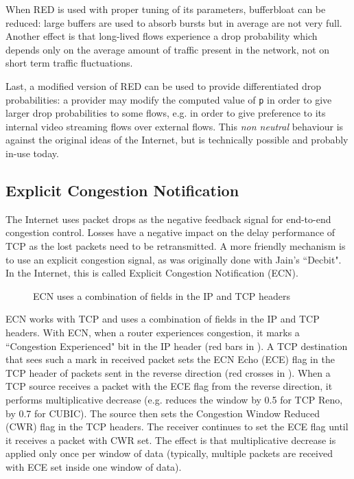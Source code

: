 
When RED is used with proper tuning of its parameters, bufferbloat can be reduced:  large buffers are used to absorb bursts but in average are not very full. Another effect is that long-lived flows experience a drop probability which depends only on the average amount of traffic present in the network, not on short term traffic fluctuations.

Last, a modified version of RED can be used to provide differentiated drop probabilities: a provider may modify the computed value of \texttt{p} in order to give larger drop probabilities to some flows, e.g. in order to give preference to its internal video streaming flows over external flows. This \emph{non neutral} behaviour is against the original ideas of the Internet, but is technically possible and probably in-use today.


\subsection{Explicit Congestion Notification}

The Internet uses packet drops as the negative feedback signal for
end-to-end congestion control. Losses have a negative impact on the delay performance of TCP as the lost packets need to be retransmitted. A more friendly mechanism is to use an explicit congestion signal, as was originally done with Jain's ``Decbit". In the Internet, this is called
Explicit Congestion Notification (ECN).

\begin{figure}[h]
  \caption{ECN uses a combination of fields in the IP and TCP headers}\label{fig-ecn}
\end{figure}


ECN works with TCP and uses a combination of fields in the IP and TCP headers. With ECN, when a router experiences congestion, it marks a ``Congestion Experienced" bit in the IP header (red bars in ). A TCP destination that sees such a mark in received packet sets the ECN Echo (ECE) flag in the TCP header of packets sent in the reverse direction (red crosses in ). When a TCP source receives a packet with the ECE flag from the reverse direction, it performs multiplicative decrease (e.g. reduces the window by 0.5 for TCP Reno, by 0.7 for CUBIC). The source then sets the Congestion Window Reduced (CWR) flag in the TCP headers. The receiver continues to set the ECE flag until it receives a packet with CWR set. The effect is that multiplicative decrease is applied only once per window of data (typically, multiple packets are received with ECE set inside one window of data).

